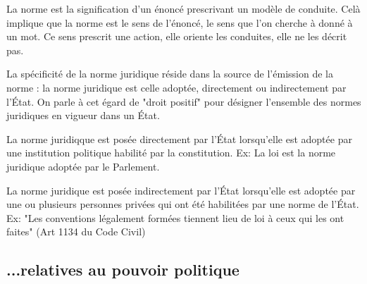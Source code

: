 ﻿\documentclass[12pt, a4paper, openany]{book}
\begin{document}
La norme est la signification d'un énoncé prescrivant un modèle de conduite. Celà implique que la norme est le sens de l'énoncé, le sens que l'on cherche à donné à un mot. Ce sens prescrit une action, elle oriente les conduites, elle ne les décrit pas.

La spécificité de la norme juridique réside dans la source de l'émission de la norme : la norme juridique est celle adoptée, directement ou indirectement par l'État. On parle à cet égard de "droit positif" pour désigner l'ensemble des normes juridiques en vigueur dans un État.

La norme juridiqque est posée directement par l'État lorsqu'elle est adoptée par une institution politique habilité par la constitution. Ex: La loi est la norme juridique adoptée par le Parlement.

La norme juridique est posée indirectement par l'État lorsqu'elle est adoptée par une ou plusieurs personnes privées qui ont été habilitées par une norme de l'État. Ex: "Les conventions légalement formées tiennent lieu de loi à ceux qui les ont faites" (Art 1134 du Code Civil)

		\subsection{...relatives au pouvoir politique}
\end{document}
